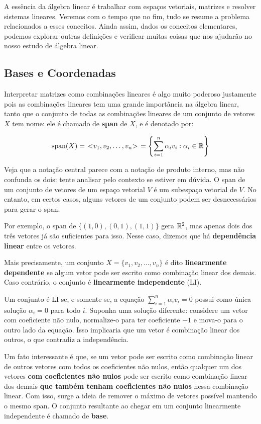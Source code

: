 \documentclass[11pt, a4paper]{article}
\begin{document}
A essência da álgebra linear é trabalhar com espaços vetoriais, matrizes e resolver sistemas lineares. Veremos com o tempo que no fim, tudo se resume a problema relacionados a esses conceitos. Ainda assim, dados os conceitos elementares, podemos explorar outras definições e verificar muitas coisas que nos ajudarão no nosso estudo de álgebra linear.

\subsection{Bases e Coordenadas}

Interpretar matrizes como combinações lineares é algo muito poderoso justamente pois as combinações lineares tem uma grande importância na álgebra linear, tanto que o conjunto de todas as combinações lineares de um conjunto de vetores \(X\) tem nome: ele é chamado de \textbf{span} de \(X\), e é denotado por:

\[
\text{span}(X) = \hspace*{0.4em} < \hspace*{-0.25em} v_1, v_2, \ldots, v_n \hspace*{-0.25em} > \hspace*{0.4em} = \left\{ \sum_{i=1}^n \alpha_i v_i : \alpha_i \in \mathbb{R} \right\}
\]

\void[0.2]

Veja que a notação central parece com a notação de produto interno, mas não confunda os dois: tente analisar pelo contexto se estiver em dúvida. O span de um conjunto de vetores de um espaço vetorial \(V\) é um subespaço vetorial de \(V\). No entanto, em certos casos, alguns vetores de um conjunto podem ser desnecessários para gerar o span.

Por exemplo, o span de \(\{(1,0), (0,1), (1,1)\}\) gera \(\mathbb{R}^2\), mas apenas dois dos três vetores já são suficientes para isso. Nesse caso, dizemos que há \textbf{dependência linear} entre os vetores.

Mais precisamente, um conjunto \(X = \{v_1, v_2, \ldots, v_n\}\) é dito \textbf{linearmente dependente} se algum vetor pode ser escrito como combinação linear dos demais. Caso contrário, o conjunto é \textbf{linearmente independente} (LI).

Um conjunto é LI se, e somente se, a equação \(\sum_{i=1}^n \alpha_i v_i = 0\) possui como única solução \(\alpha_i = 0\) para todo \(i\). Suponha uma solução diferente: considere um vetor com coeficiente não nulo, normalize-o para ter coeficiente \(-1\) e mova-o para o outro lado da equação. Isso implicaria que um vetor é combinação linear dos outros, o que contradiz a independência.

Um fato interessante é que, se um vetor pode ser escrito como combinação linear de outros vetores com todos os coeficientes não nulos, então qualquer um dos vetores \textbf{com coeficientes não nulos} pode ser escrito como combinação linear dos demais \textbf{que também tenham coeficientes não nulos} nessa combinação linear. Com isso, surge a ideia de remover o máximo de vetores possível mantendo o mesmo span. O conjunto resultante ao chegar em um conjunto linearmente independente é chamado de \textbf{base}.
\end{document}
